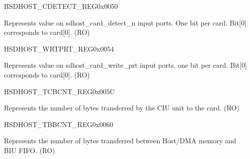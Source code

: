 \begin{register}{H}{SDHOST\_CDETECT\_REG}{0x0050}\label{regdesc:SDHOSTCDETECTREG}
%
%
\regnewline%
\begin{regdesc}\begin{reglist}
\label{fielddesc:SDHOSTCARDDETECTN}\item [SDHOST\_CARD\_DETECT\_N] Represents value on sdhost\_card\_detect\_n input ports. One bit per card. Bit[0] corresponds to card[0]. (RO)
\end{reglist}\end{regdesc}
\end{register}


\begin{register}{H}{SDHOST\_WRTPRT\_REG}{0x0054}\label{regdesc:SDHOSTWRTPRTREG}
%
%
\regnewline%
\begin{regdesc}\begin{reglist}
\label{fielddesc:SDHOSTWRITEPROTECT}\item [SDHOST\_WRITE\_PROTECT] Represents value on sdhost\_card\_write\_prt input ports, one bit per card. Bit[0] corresponds to card[0]. (RO)
\end{reglist}\end{regdesc}
\end{register}


\begin{register}{H}{SDHOST\_TCBCNT\_REG}{0x005C}\label{regdesc:SDHOSTTCBCNTREG}
%
\regnewline%
\begin{regdesc}\begin{reglist}
\label{fielddesc:SDHOSTTCBCNTREG}\item [SDHOST\_TCBCNT\_REG] Represents the number of bytes transferred by the CIU unit to the card. (RO)
\end{reglist}\end{regdesc}
\end{register}


\begin{register}{H}{SDHOST\_TBBCNT\_REG}{0x0060}\label{regdesc:SDHOSTTBBCNTREG}
%
\regnewline%
\begin{regdesc}\begin{reglist}
\label{fielddesc:SDHOSTTBBCNTREG}\item [SDHOST\_TBBCNT\_REG] Represents the number of bytes transferred between Host/DMA memory and BIU FIFO. (RO)
\end{reglist}\end{regdesc}
\end{register}


